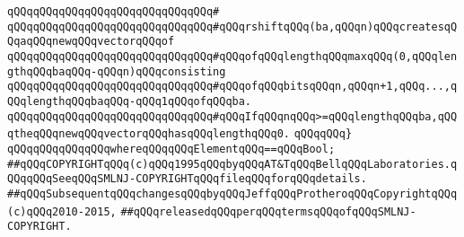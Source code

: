 \verb|qQQqqQQqqQQqqQQqqQQqqQQqqQQqqQQq#|\newline
\verb|qQQqqQQqqQQqqQQqqQQqqQQqqQQqqQQq#qQQqrshiftqQQq(ba,qQQqn)qQQqcreatesqQQqaqQQqnewqQQqvectorqQQqof|\newline
\verb|qQQqqQQqqQQqqQQqqQQqqQQqqQQqqQQq#qQQqofqQQqlengthqQQqmaxqQQq(0,qQQqlengthqQQqbaqQQq-qQQqn)qQQqconsisting|\newline
\verb|qQQqqQQqqQQqqQQqqQQqqQQqqQQqqQQq#qQQqofqQQqbitsqQQqn,qQQqn+1,qQQq...,qQQqlengthqQQqbaqQQq-qQQq1qQQqofqQQqba.|\newline
\verb|qQQqqQQqqQQqqQQqqQQqqQQqqQQqqQQq#qQQqIfqQQqnqQQq>=qQQqlengthqQQqba,qQQqtheqQQqnewqQQqvectorqQQqhasqQQqlengthqQQq0.|\newline
\newline
\newline
\verb|qQQqqQQq}|\newline
\verb|qQQqqQQqqQQqqQQqwhereqQQqqQQqElementqQQq==qQQqBool;|\newline
\newline
\newline
\verb|##qQQqCOPYRIGHTqQQq(c)qQQq1995qQQqbyqQQqAT&TqQQqBellqQQqLaboratories.qQQqqQQqSeeqQQqSMLNJ-COPYRIGHTqQQqfileqQQqforqQQqdetails.|\newline
\verb|##qQQqSubsequentqQQqchangesqQQqbyqQQqJeffqQQqProtheroqQQqCopyrightqQQq(c)qQQq2010-2015,|\newline
\verb|##qQQqreleasedqQQqperqQQqtermsqQQqofqQQqSMLNJ-COPYRIGHT.|\newline

